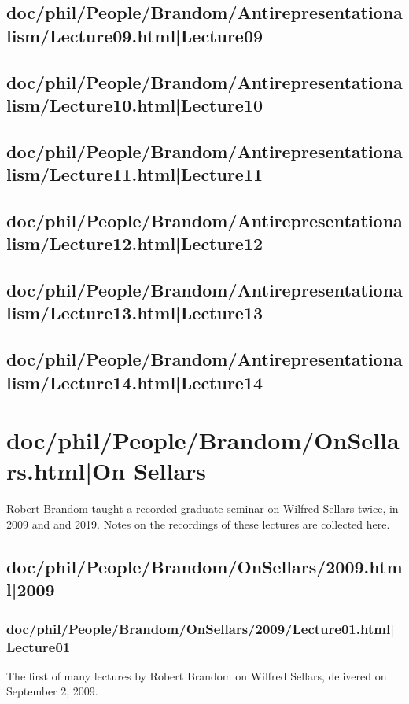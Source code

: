 \documentclass[12pt,a4paper]{report}
\begin{document}
\chapter{doc/phil/People/Brandom/Antirepresentationalism/Lecture09.html|Lecture09}

\chapter{doc/phil/People/Brandom/Antirepresentationalism/Lecture10.html|Lecture10}

\chapter{doc/phil/People/Brandom/Antirepresentationalism/Lecture11.html|Lecture11}

\chapter{doc/phil/People/Brandom/Antirepresentationalism/Lecture12.html|Lecture12}

\chapter{doc/phil/People/Brandom/Antirepresentationalism/Lecture13.html|Lecture13}

\chapter{doc/phil/People/Brandom/Antirepresentationalism/Lecture14.html|Lecture14}

\part{doc/phil/People/Brandom/OnSellars.html|On Sellars}
Robert Brandom taught a recorded graduate seminar on Wilfred Sellars twice, in 2009 and and 2019. Notes on the recordings of these lectures are collected here.
\chapter{doc/phil/People/Brandom/OnSellars/2009.html|2009}

\section{doc/phil/People/Brandom/OnSellars/2009/Lecture01.html|Lecture01}
The first of many lectures by Robert Brandom on Wilfred Sellars, delivered on September 2, 2009.
\end{document}
